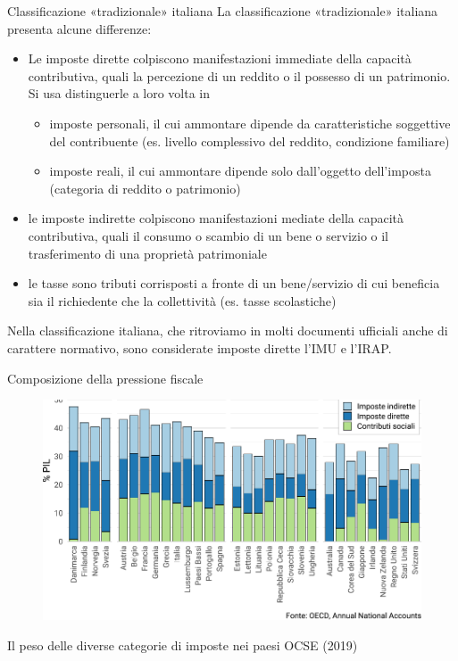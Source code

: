 \documentclass[aspectratio=64,11pt]{beamer}
\begin{document}
\begin{frame}{Classificazione «tradizionale» italiana}
La classificazione «tradizionale» italiana presenta alcune differenze:
\begin{itemize}
\item Le \alert{imposte dirette} colpiscono manifestazioni immediate della capacità
contributiva, quali la percezione di un reddito o il possesso di un
patrimonio. Si usa distinguerle a loro volta in
\begin{itemize}
\item imposte \alert{personali}, il cui ammontare dipende da caratteristiche
soggettive del contribuente (es. livello complessivo del reddito,
condizione familiare)
\item imposte \alert{reali}, il cui ammontare dipende solo dall'oggetto dell'imposta
(categoria di reddito o patrimonio)
\end{itemize}
\item le \alert{imposte indirette} colpiscono manifestazioni mediate della capacità
contributiva, quali il consumo o scambio di un bene o servizio o il
trasferimento di una proprietà patrimoniale
\item le \alert{tasse} sono tributi corrisposti a fronte di un bene/servizio di cui
beneficia sia il richiedente che la collettività (es. tasse scolastiche)
\end{itemize}

\begin{block}{}
Nella classificazione italiana, che ritroviamo in molti documenti ufficiali anche di carattere normativo, sono considerate imposte dirette l'IMU e l'IRAP.
\end{block}
\end{frame}

\begin{frame}{Composizione della pressione fiscale}
\begin{figure}[htbp]
\centering
\includegraphics[width=\textwidth]{./figure/classificazione-imposte-oecd-color.pdf}
\end{figure}

\vspace{-3mm}
Il peso delle diverse categorie di imposte nei paesi OCSE (2019)
\end{frame}
\end{document}
